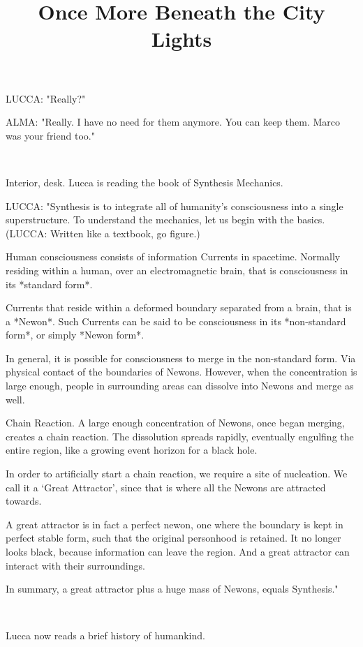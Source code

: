 \documentclass[11pt]{article}
\begin{document}
\ttfamily
\title{Once More Beneath the City Lights}
\maketitle

LUCCA: "Really?"

ALMA: "Really. I have no need for them anymore.
You can keep them.
Marco was your friend too."

\ 

Interior, desk.
Lucca is reading the book of Synthesis Mechanics.

LUCCA: "Synthesis is to integrate all of humanity's consciousness into a single superstructure.
To understand the mechanics, let us begin with the basics.
(LUCCA: Written like a textbook, go figure.)

Human consciousness consists of information Currents in spacetime.
Normally residing within a human, over an electromagnetic brain, that is consciousness in its *standard form*.

Currents that reside within a deformed boundary separated from a brain, that is a *Newon*.
Such Currents can be said to be consciousness in its *non-standard form*, or simply *Newon form*.

In general, it is possible for consciousness to merge in the non-standard form.
Via physical contact of the boundaries of Newons.
However, when the concentration is large enough, people in surrounding areas can dissolve into Newons and merge as well.

Chain Reaction.
A large enough concentration of Newons, once began merging, creates a chain reaction. 
The dissolution spreads rapidly, eventually engulfing the entire region, like a growing event horizon for a black hole.

In order to artificially start a chain reaction, we require a site of nucleation. 
We call it a `Great Attractor', since that is where all the Newons are attracted towards.

A great attractor is in fact a perfect newon, one where the boundary is kept in perfect stable form, such that the original personhood is retained.
It no longer looks black, because information can leave the region.
And a great attractor can interact with their surroundings.

In summary, a great attractor plus a huge mass of Newons, equals Synthesis."

\ 

Lucca now reads a brief history of humankind.
\end{document}
